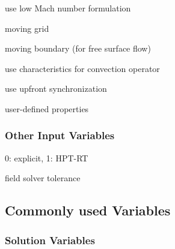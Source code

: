 \documentclass[letterpaper,10pt,english]{sphinxmanual}
\begin{document}
 use low Mach number formulation

 moving grid

 moving boundary (for free surface flow)

 use characteristics for convection operator

 use upfront synchronization

 user-defined properties


\subsubsection{Other Input Variables}
\label{\detokenize{appendix:other-input-variables}}
 0: explicit, 1: HPT-RT

 field solver tolerance


\subsection{Commonly used Variables}
\label{\detokenize{appendix:commonly-used-variables}}

\subsubsection{Solution Variables}
\label{\detokenize{appendix:solution-variables}}
\end{document}
